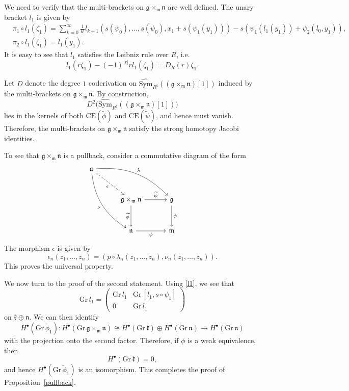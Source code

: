 \documentclass[12pt]{amsart}
\numberwithin{equation}{section}
\theoremstyle{plain}
\newcommand{\fg}{\mathfrak{g}}
\newcommand{\fk}{\mathfrak{k}}
\newcommand{\fm}{\mathfrak{m}}
\newcommand{\fn}{\mathfrak{n}}
\newcommand{\Sym}{\mathrm{Sym}}
\newcommand{\Gr}{\mathrm{Gr}}
\newcommand{\CE}{\mathrm{CE}}
\newcommand{\wSym}{\widehat{\Sym}}
\newcommand{\uR}{{R^\sharp}}
\begin{document}
	We need to verify that the multi-brackets on $\fg \times_\fm \fn$ are well defined.
	The unary bracket $l_1$ is given by
	\begin{equation}\label{l1}
		\begin{aligned}
			&\pi_1 \circ l_1(\zeta_1) =\sum_{k=0}^\infty\frac{1}{k!}l_{k+1}(s(\psi_0), \dots, s(\psi_0), x_1 + s (\psi_1(y_1)))- s\left( \psi_1(l_1(y_1)) + \psi_2(l_0,y_1)\right), \\
			&\pi_2 \circ l_1(\zeta_1) =l_1(y_1). 
		\end{aligned}
	\end{equation}
	It is easy to see that $l_1$ satisfies the Leibniz rule over $R$, i.e.
	\[
	l_1(r \zeta_1) - (-1)^{|r|} r l_1(\zeta_1) = D_R(r) \zeta_1.
	\]
	
	Let $D$ denote the degree $1$ coderivation on $\wSym_\uR((\fg \times_\fm \fn)[1])$ induced by the multi-brackets on $\fg \times_\fm \fn$. By construction,
	\[
	D^2\bigl(\wSym_\uR((\fg \times_\fm \fn)[1])\bigr)
	\]
	lies in the kernels of both $\CE(\widetilde{\phi})$ and $\CE(\widetilde{\psi})$, and hence must vanish. Therefore, the multi-brackets on $\fg \times_\fm \fn$ satisfy the strong homotopy Jacobi identities.
	
	
	To see that $\mathfrak{g}\times_{\mathfrak{m}} \mathfrak{n}$ is a pullback, consider a commutative diagram of the form
	\[
	\begin{tikzcd}[column sep=30pt, row sep=30pt]
		\mathfrak{a}
		\arrow[bend right=25,ddr,"\nu"']
		\arrow[bend left=25,drr,"\lambda"]
		\arrow[dashed,dr,"\epsilon"']
		&&
		\\
		&
		\mathfrak{g}\times_{\mathfrak{m}} \mathfrak{n}
		\arrow[d,"\widetilde{\phi}"']
		\arrow[r,"\widetilde{\psi}"]
		&
		\mathfrak{g} \arrow[d,"\phi"]
		\\
		&
		\mathfrak{n} \arrow[r,"\psi"']
		&
		\mathfrak{m}
	\end{tikzcd}
	\]
	The morphism $\epsilon$ is given by
	\[
	\epsilon_n(z_1,\ldots,z_n)
	=
	(p \circ \lambda_n(z_1,\ldots,z_n), \nu_n(z_1,\ldots,z_n)).
	\]
	This proves the universal property.
	
	We now turn to the proof of the second statement. Using \eqref{l1}, we see that
	\[
	\Gr\, l_1 =
	\begin{pmatrix}
		\Gr\, l_1 & \Gr\,[l_1, s \circ \psi_1] \\
		0 & \Gr\, l_1
	\end{pmatrix}
	\]
	on $\fk \oplus \fn$. We can then identify
	\[
	H^\bullet(\Gr\, \widetilde{\phi}_1)\colon
	H^\bullet(\Gr\, \fg \times_\fm \fn)
	\cong
	H^\bullet(\Gr\, \fk)\oplus H^\bullet(\Gr\, \fn)
	\longrightarrow
	H^\bullet(\Gr\, \fn)
	\]
	with the projection onto the second factor. Therefore, if $\phi$ is a weak equivalence, then
	\[
	H^\bullet(\Gr\, \fk)=0,
	\]
	and hence $H^\bullet(\Gr\, \widetilde{\phi}_1)$ is an isomorphism. This completes the proof of Proposition~\ref{pullback}.
	
\end{document}
